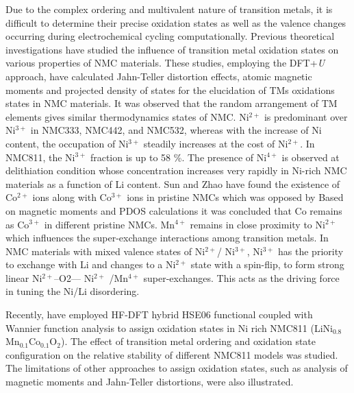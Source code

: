 \documentclass[journal=jacsat,manuscript=article]{achemso}
\newcommand{\re}[1]{\textcolor{red}{#1}}
\begin{document}
Due to the complex ordering and multivalent nature of transition metals, it is difficult to determine their precise oxidation states as well as the valence changes occurring during electrochemical cycling computationally. Previous theoretical investigations have studied the influence of transition metal oxidation states on various properties of NMC materials. \cite{Dan-Thomas-chemmater,Sun_JPhysChemC2017,Dixit_JPhysChemC2017,Hoang_ACSChemMater2016,Dixit_JElecSoc2017}  These studies, employing the DFT+\textit{U} approach, have calculated Jahn-Teller distortion effects, atomic magnetic moments and projected density of states for the elucidation of TMs oxidations states in NMC materials. It was observed that the random arrangement of TM elements gives similar thermodynamics states of NMC. \cite{Sun_JPhysChemC2017} Ni$^{2+}$ is predominant over Ni$^{3+}$ in NMC333, NMC442, and NMC532, whereas with the increase of Ni content, the occupation of Ni$^{3+}$ steadily increases at the cost of Ni$^{2+}$. In NMC811, the Ni$^{3+}$  fraction is up to 58 \%. \cite{ Sun_JPhysChemC2017} The presence of Ni$^{4+}$ is observed at delithiation condition whose concentration increases very rapidly in Ni-rich NMC materials as a function of Li content. \cite{ Dixit_JPhysChemC2017} Sun and Zhao \cite{ Sun_JPhysChemC2017} have found the existence of Co$^{2+}$ ions along with Co$^{3+}$  ions in pristine NMCs which was opposed by \citeauthor{Dixit_JPhysChemC2017}\cite{ Dixit_JPhysChemC2017} Based on magnetic moments and PDOS calculations it was concluded that Co remains as Co$^{3+}$ in different pristine NMCs. Mn$^{4+}$ remains in close proximity to Ni$^{2+}$ which influences the super-exchange interactions among transition metals. \cite{zheng2019} In NMC materials with mixed valence states of Ni$^{2+}$/ Ni$^{3+}$, Ni$^{3+}$  has the priority to exchange with Li and changes to a Ni$^{2+}$ state with a spin-flip, to form strong linear Ni$^{2+}$–O2–– Ni$^{2+}$ /Mn$^{4+}$  super-exchanges. This acts as the driving force in tuning the Ni/Li disordering. \cite{zheng2019,Zheng-acs.jpclett-2017} 

Recently, \re{\citeauthor{rana}} have employed HF-DFT hybrid HSE06 functional coupled with Wannier function analysis to assign oxidation states in Ni rich NMC811 (LiNi$_{0.8}$Mn$_{0.1}$Co$_{0.1}$O$_{2}$). \cite{rana} The effect of transition metal ordering and oxidation state configuration on the relative stability of different NMC811 models was studied. The limitations of other approaches to assign oxidation states, such as analysis of magnetic moments and Jahn-Teller distortions, were also illustrated.
\end{document}
